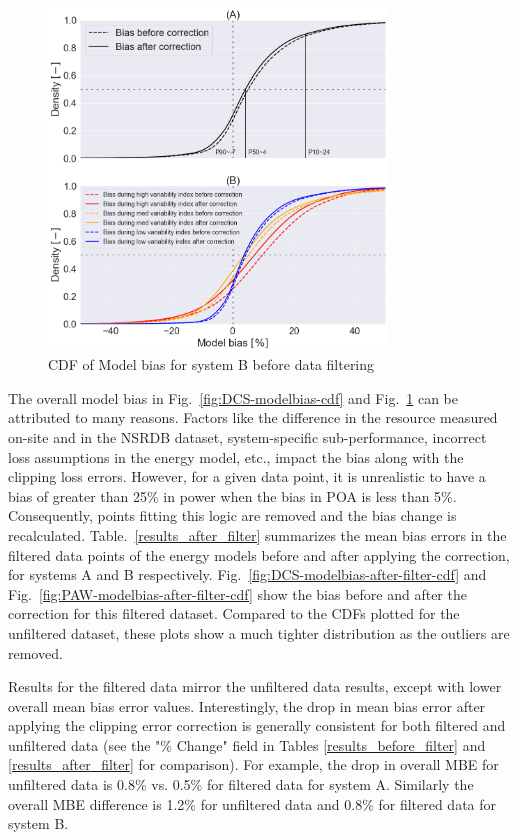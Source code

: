 \documentclass[conference]{IEEEtran}
\begin{document}
\begin{figure}[htbp]
\centerline{\includegraphics[width=9cm]{PAW_ModelBias_breakdown_CDF_v4.png}}
\caption{CDF of Model bias for system B before data filtering}
\label{fig:PAW-modelbias-cdf}
\end{figure}

The overall model bias in Fig.~\ref{fig:DCS-modelbias-cdf} and Fig.~\ref{fig:PAW-modelbias-cdf} can be attributed to many reasons. Factors like the difference in the resource measured on-site and in the NSRDB dataset, system-specific sub-performance, incorrect loss assumptions in the energy model, etc., impact the bias along with the clipping loss errors. However, for a given data point, it is unrealistic to have a bias of greater than 25\% in power when the bias in POA is less than 5\%. Consequently, points fitting this logic are removed and the bias change is recalculated. Table.~\ref{results_after_filter} summarizes the mean bias errors in the filtered data points of the energy models before and after applying the correction, for systems A and B respectively. Fig.~\ref{fig:DCS-modelbias-after-filter-cdf} and Fig.~\ref{fig:PAW-modelbias-after-filter-cdf} show the bias before and after the correction for this filtered dataset. Compared to the CDFs plotted for the unfiltered dataset, these plots show a much tighter distribution as the outliers are removed. 

Results for the filtered data mirror the unfiltered data results, except with lower overall mean bias error values. Interestingly, the drop in mean bias error after applying the clipping error correction is generally consistent for both filtered and unfiltered data (see the "\% Change" field in Tables \ref{results_before_filter} and \ref{results_after_filter} for comparison). For example, the drop in overall MBE for unfiltered data is 0.8\% vs. 0.5\% for filtered data for system A. Similarly the overall MBE difference is 1.2\% for unfiltered data and 0.8\% for filtered data for system B.  
\end{document}
